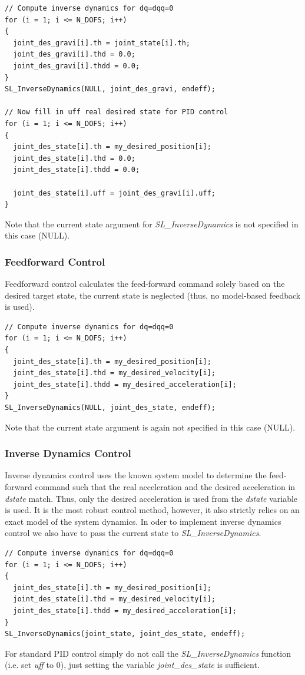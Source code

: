 \documentclass[11pt, article, colorback]{article}
\begin{document}
\begin{lstlisting}
// Compute inverse dynamics for dq=dqq=0 
for (i = 1; i <= N_DOFS; i++)
{
  joint_des_gravi[i].th = joint_state[i].th;
  joint_des_gravi[i].thd = 0.0;
  joint_des_gravi[i].thdd = 0.0;
}
SL_InverseDynamics(NULL, joint_des_gravi, endeff);

// Now fill in uff real desired state for PID control
for (i = 1; i <= N_DOFS; i++)
{
  joint_des_state[i].th = my_desired_position[i];
  joint_des_state[i].thd = 0.0;
  joint_des_state[i].thdd = 0.0;

  joint_des_state[i].uff = joint_des_gravi[i].uff;
}
\end{lstlisting}
Note that the current state argument for {\em SL\_InverseDynamics} is not specified in this case (NULL).

\subsubsection{Feedforward Control}
Feedforward control calculates the feed-forward command solely based on the desired target state, the current state is neglected (thus, no model-based feedback is used).
\begin{lstlisting}
// Compute inverse dynamics for dq=dqq=0 
for (i = 1; i <= N_DOFS; i++)
{
  joint_des_state[i].th = my_desired_position[i];
  joint_des_state[i].thd = my_desired_velocity[i];
  joint_des_state[i].thdd = my_desired_acceleration[i];
}
SL_InverseDynamics(NULL, joint_des_state, endeff);
\end{lstlisting}
Note that the current state argument is again not specified in this case (NULL).

\subsubsection{Inverse Dynamics Control}
Inverse dynamics control uses the known system model to determine the feed-forward command such that the real acceleration and the desired acceleration in {\em dstate} match. Thus, only the desired 
acceleration is used from the {\em dstate} variable is used. It is the most robust control method, however, it also strictly relies on an exact model of the system dynamics. 
In oder to implement inverse dynamics control we also have to pass the current state to {\em SL\_InverseDynamics}.
\begin{lstlisting}
// Compute inverse dynamics for dq=dqq=0 
for (i = 1; i <= N_DOFS; i++)
{
  joint_des_state[i].th = my_desired_position[i];
  joint_des_state[i].thd = my_desired_velocity[i];
  joint_des_state[i].thdd = my_desired_acceleration[i];
}
SL_InverseDynamics(joint_state, joint_des_state, endeff);
\end{lstlisting}
For standard PID control simply do not call the {\em SL\_InverseDynamics} function (i.e. set {\em uff} to $0$), just setting the variable {\em joint\_des\_state} is sufficient.
\end{document}
